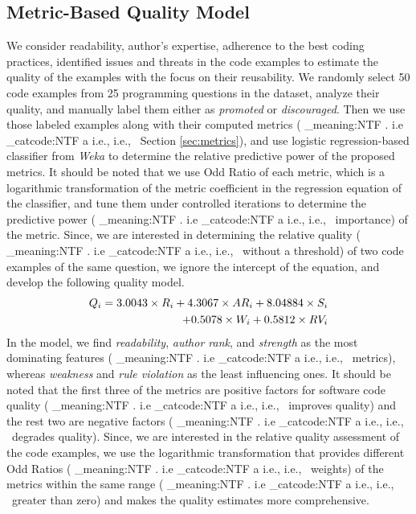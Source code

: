 \documentclass[conference]{IEEEtran}
\makeatletter
\newcommand\latinabbrev[1]{
  \peek_meaning:NTF . {%
    #1\@}%
  { \peek_catcode:NTF a {%
      #1., \@ }%
    {#1., \@}}}
\def\ie{\latinabbrev{i.e}}
\makeatother
\begin{document}
\subsection{Metric-Based Quality Model}
We consider readability, author's expertise, adherence to the best coding practices, identified issues and threats in the code examples to estimate the quality of the examples with the focus on their reusability. We randomly select 50 code examples from 25 programming questions in the dataset, analyze their quality, and manually label them either as \emph{promoted} or \emph{discouraged}. Then we use those labeled examples along with their computed metrics (\ie\ Section \ref{sec:metrics}), and use logistic regression-based classifier from \emph{Weka} to determine the relative predictive power of the proposed metrics. It should be noted that we use Odd Ratio \cite{specmining} of each metric, which is a logarithmic transformation of the metric coefficient in the regression equation of the classifier, and tune them under controlled iterations to determine the predictive power (\ie\ importance) of the metric. Since, we are interested in determining the relative quality (\ie\ without a threshold) of two code examples of the same question, we ignore the intercept of the equation, and develop the following quality model. 
\begin{equation}\label{eq:model}
\vspace{-.1cm}
\begin{split}
Q_{i}=3.0043\times R_{i}+4.3067\times AR_{i}
+8.04884\times S_{i}\\+0.5078\times W_{i}+0.5812\times RV_{i}
\end{split}
\vspace{-.1cm}
\end{equation}
In the model, we find \emph{readability}, \emph{author rank}, and \emph{strength} as the most dominating features (\ie\ metrics), whereas \emph{weakness} and \emph{rule violation} as the least influencing ones. It should be noted that the first three of the metrics are positive factors for software code quality (\ie\ improves quality) and the rest two are negative factors (\ie\ degrades quality). Since, we are interested in the relative quality assessment of the code examples, we use the logarithmic transformation that provides different Odd Ratios (\ie\ weights) of the metrics within the same range (\ie\ greater than zero) and makes the quality estimates more comprehensive.
\end{document}
